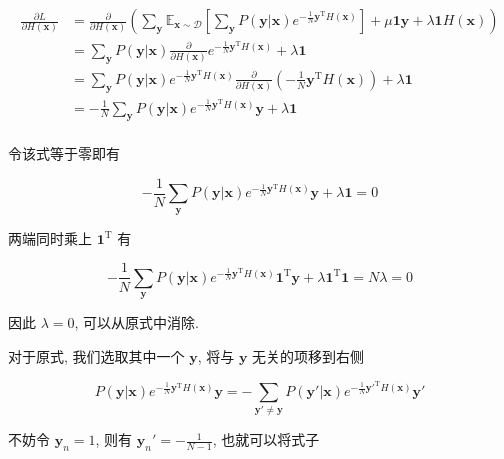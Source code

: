 \documentclass[answers]{exam}  %
\begin{document}
\begin{questions}
\begin{solution}
\begin{enumerate}
            $$
              \begin{aligned}
                \frac{\partial L}{\partial H(\bm{x})} & = \frac{\partial}{\partial H(\bm{x})}(\sum_{\bm{y}}\mathbb{E}_{\bm{x}\sim \mathcal{D}}[\sum_{\bm{y}}P(\bm{y}|\bm{x})e^{-\frac{1}{N}\bm{y}^{\mathrm{T}}H(\bm{x})}] + \mu \bm{1}\bm{y} + \lambda \bm{1}H(\bm{x})) \\
                                                      & = \sum_{\bm{y}}P(\bm{y}|\bm{x})\frac{\partial}{\partial H(\bm{x})}e^{-\frac{1}{N}\bm{y}^{\mathrm{T}}H(\bm{x})} + \lambda \bm{1}                                                                                 \\
                                                      & = \sum_{\bm{y}}P(\bm{y}|\bm{x})e^{-\frac{1}{N}\bm{y}^{\mathrm{T}}H(\bm{x})}\frac{\partial}{\partial H(\bm{x})}(-\frac{1}{N}\bm{y}^{\mathrm{T}}H(\bm{x})) + \lambda \bm{1}                                       \\
                                                      & = -\frac{1}{N}\sum_{\bm{y}}P(\bm{y}|\bm{x})e^{-\frac{1}{N}\bm{y}^{\mathrm{T}}H(\bm{x})}\bm{y} + \lambda \bm{1}                                                                                                  \\
              \end{aligned}
            $$

            令该式等于零即有

            $$
              -\frac{1}{N}\sum_{\bm{y}}P(\bm{y}|\bm{x})e^{-\frac{1}{N}\bm{y}^{\mathrm{T}}H(\bm{x})}\bm{y} + \lambda \bm{1} = 0
            $$

            两端同时乘上 $\bm{1}^{\mathrm{T}}$ 有

            $$
              -\frac{1}{N}\sum_{\bm{y}}P(\bm{y}|\bm{x})e^{-\frac{1}{N}\bm{y}^{\mathrm{T}}H(\bm{x})}\bm{1}^{\mathrm{T}}\bm{y} + \lambda \bm{1}^{\mathrm{T}}\bm{1} = N\lambda = 0
            $$

            因此 $\lambda = 0$, 可以从原式中消除.

            对于原式, 我们选取其中一个 $\bm{y}$, 将与 $\bm{y}$ 无关的项移到右侧

            $$
              P(\bm{y}|\bm{x})e^{-\frac{1}{N}\bm{y}^{\mathrm{T}}H(\bm{x})}\bm{y} = - \sum_{\bm{y}' \neq \bm{y}}P(\bm{y}'|\bm{x})e^{-\frac{1}{N}\bm{y}'^{\mathrm{T}}H(\bm{x})}\bm{y}'
            $$

            不妨令 $\bm{y}_{n} = 1$, 则有 $\displaystyle \bm{y}_{n}' = -\frac{1}{N-1}$, 也就可以将式子


\end{enumerate}
\end{solution}
\end{questions}
\end{document}
